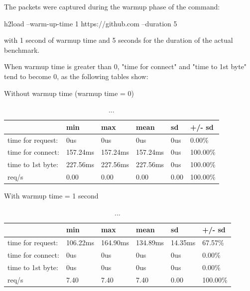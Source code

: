 \documentclass[a4paper,10pt]{article}
\begin{document}
The packets were captured during the warmup phase of the command:

h2load --warm-up-time 1 https://github.com --duration 5 

with 1 second of warmup time and 5 seconds for the duration of the actual benchmark.


When warmup time is greater than 0, "time for connect" and "time to 1st byte" tend to become 0, as the following tables show:


Without warmup time (warmup time = 0)

\begin{table}[h!]
\centering
\begin{tabular}{|l|l|l|l|l|l|}
\hline
                  & min      & max      & mean     & sd   & +/- sd   \\ \hline
time for request: & 0us      & 0us      & 0us      & 0us  & 0.00\%   \\ \hline
time for connect: & 157.24ms & 157.24ms & 157.24ms & 0us  & 100.00\% \\ \hline
time to 1st byte: & 227.56ms & 227.56ms & 227.56ms & 0us  & 100.00\% \\ \hline
req/s             & 0.00     & 0.00     & 0.00     & 0.00 & 100.00\% \\ \hline
\end{tabular}

\caption{...}
\label{fig:table4}

\end{table}


With warmup time = 1 second


\begin{table}[h!]
\centering
\begin{tabular}{|l|l|l|l|l|l|}
\hline
                  & min      & max      & mean     & sd      & +/- sd   \\ \hline
time for request: & 106.22ms & 164.90ms & 134.89ms & 14.35ms & 67.57\%  \\ \hline
time for connect: & 0us      & 0us      & 0us      & 0us     & 0.00\%   \\ \hline
time to 1st byte: & 0us      & 0us      & 0us      & 0us     & 0.00\%   \\ \hline
req/s             & 7.40     & 7.40     & 7.40     & 0.00    & 100.00\% \\ \hline
\end{tabular}

\caption{...}
\label{fig:table5}

\end{table}
\end{document}
